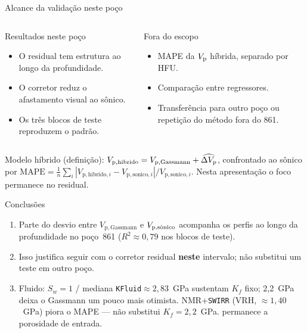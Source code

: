\documentclass[aspectratio=169,10pt]{beamer}
\begin{document}
\begin{frame}{Alcance da validação neste poço}
  \footnotesize
  \begin{columns}[T,onlytextwidth]
    \begin{block}{Resultados neste poço}
      \scriptsize
      \begin{itemize}
        \item O residual tem estrutura ao longo da profundidade.
        \item O corretor reduz o afastamento visual ao sônico.
        \item Os três blocos de teste reproduzem o padrão.
      \end{itemize}
    \end{block}
    \begin{exampleblock}{Fora do escopo}
      \scriptsize
      \begin{itemize}
        \item MAPE da $\Vp$ híbrida, separado por HFU.
        \item Comparação entre regressores.
        \item Transferência para outro poço ou repetição do método
              fora do 861.
      \end{itemize}
    \end{exampleblock}
  \end{columns}
  \vspace{0.10cm}
  {\scriptsize
  Modelo híbrido (definição):
  $V_{\mathrm{p,hibrido}}=V_{\mathrm{p,Gassmann}}+\widehat{\dVp}$,
  confrontado ao sônico por
  $\mathrm{MAPE}=\frac{1}{n}\sum_i
  |V_{\mathrm{p,hibrido},i}-V_{\mathrm{p,sonico},i}|
  /V_{\mathrm{p,sonico},i}$.
  Nesta apresentação o foco permanece no residual.}
\end{frame}

\begin{frame}{Conclusões}
  \footnotesize
  \begin{enumerate}\setlength{\itemsep}{0.18em}
    \item Parte do desvio entre $V_{\mathrm{p,Gassmann}}$ e $\Vpsonsub$
          acompanha os perfis ao longo da profundidade no poço~861
          ($R^2 \approx 0{,}79$ nos blocos de teste).
    \item Isso justifica seguir com o corretor residual \textbf{neste}
          intervalo; não substitui um teste em outro poço.
    \item Fluido: $S_w=1$ / mediana \texttt{KFluid}$\approx 2{,}83$~GPa
          sustentam $K_f$ fixo; 2,2~GPa deixa o Gassmann um pouco mais
          otimista. NMR+\texttt{SWIRR} (VRH, $\approx 1{,}40$~GPa)
          piora o MAPE --- não substitui $K_f=2{,}2$~GPa.
          \phiND{} permanece a porosidade de entrada.
  \end{enumerate}
\end{frame}
\end{document}
